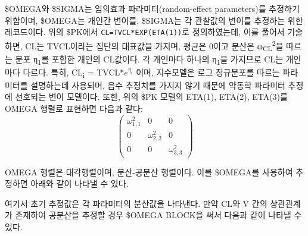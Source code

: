 \documentclass[
  10pt,
  krantz2,
  a4paper]{krantz}
\newenvironment{Shaded}{\begin{snugshade}}{\end{snugshade}}
\newcommand{\DecValTok}[1]{\textcolor[rgb]{0.00,0.00,0.81}{#1}}
\newcommand{\FloatTok}[1]{\textcolor[rgb]{0.00,0.00,0.81}{#1}}
\newcommand{\KeywordTok}[1]{\textcolor[rgb]{0.13,0.29,0.53}{\textbf{#1}}}
\newcommand{\NormalTok}[1]{#1}
\newcommand{\OperatorTok}[1]{\textcolor[rgb]{0.81,0.36,0.00}{\textbf{#1}}}
\theoremstyle{definition}
\theoremstyle{definition}
\theoremstyle{definition}
\theoremstyle{remark}
\begin{document}
\$OMEGA와 \$SIGMA는 임의효과 파라미터(random-effect parameters)를 추정하기 위함이며, \$OMEGA는 개인간 변이를, \$SIGMA는 각 관찰값의 변이를 추정하는 위한 레코드이다. 위의 \$PK에서 \texttt{CL=TVCL*EXP(ETA(1))}로 정의하였는데, 이를 풀어서 기술하면, CL는 TVCL이라는 집단의 대표값을 가지며, 평균은 0이고 분산은 ω\textsubscript{CL}\textsuperscript{2}을 따르는 분포 η\textsubscript{1}를 포함한 개인의 CL값이다. 각 개인마다 하나의 η\textsubscript{1}을 가지므로 CL는 개인마다 다르다. 특히, CL\textsubscript{i} = TVCL*\(e^{\eta_{i}}\) 이며, 지수모델은 로그 정규분포를 따르는 파라미터를 설명하는데 사용되며, 음수 추정치를 가지지 않기 때문에 약동학 파라미터 추정에 선호되는 변이 모델이다. 또한, 위의 \$PK 모델의 ETA(1), ETA(2), ETA(3)를 OMEGA 행렬로 표현하면 다음과 같다:
\begin{equation}
\begin{pmatrix} 
   \omega_{1,1}^2 & 0 & 0 \\
   0 & \omega_{2,2}^2 & 0 \\
   0 & 0 & \omega_{3,3}^2
\label{eq:iivomega}
\end{pmatrix}
\end{equation}

OMEGA 행렬은 대각행렬이며, 분산-공분산 행렬이다. 이를 \$OMEGA를 사용하여 추정하면 아래와 같이 나타낼 수 있다.

\begin{Shaded}
\end{Shaded}

여기서 초기 추정값은 각 파라미터의 분산값을 나타낸다. 만약 CL와 V 간의 상관관계가 존재하여 공분산을 추정할 경우 \$OMEGA BLOCK을 써서 다음과 같이 나타낼 수 있다.

\begin{Shaded}
\end{Shaded}
\end{document}
